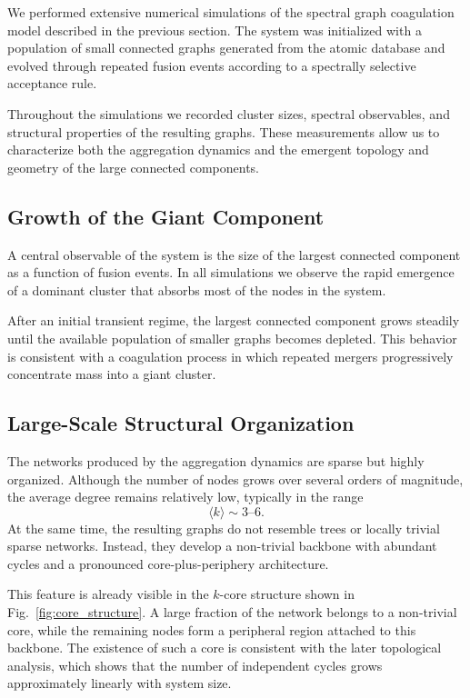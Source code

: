 \documentclass[11pt]{article}
\begin{document}
We performed extensive numerical simulations of the spectral graph coagulation model described in the previous section.
The system was initialized with a population of small connected graphs generated from the atomic database \cite{gonzalez2025algebraic} and evolved through repeated fusion events according to a spectrally selective acceptance rule.

Throughout the simulations we recorded cluster sizes, spectral observables, and structural properties of the resulting graphs.
These measurements allow us to characterize both the aggregation dynamics and the emergent topology and geometry of the large connected components.

\subsection{Growth of the Giant Component}

A central observable of the system is the size of the largest connected component as a function of fusion events.
In all simulations we observe the rapid emergence of a dominant cluster that absorbs most of the nodes in the system.

After an initial transient regime, the largest connected component grows steadily until the available population of smaller graphs becomes depleted.
This behavior is consistent with a coagulation process in which repeated mergers progressively concentrate mass into a giant cluster.

\subsection{Large-Scale Structural Organization}

The networks produced by the aggregation dynamics are sparse but highly organized.
Although the number of nodes grows over several orders of magnitude, the average degree remains relatively low, typically in the range
\[
\langle k\rangle \sim 3\text{--}6.
\]
At the same time, the resulting graphs do not resemble trees or locally trivial sparse networks.
Instead, they develop a non-trivial backbone with abundant cycles and a pronounced core-plus-periphery architecture.

This feature is already visible in the $k$-core structure shown in Fig.~\ref{fig:core_structure}.
A large fraction of the network belongs to a non-trivial core, while the remaining nodes form a peripheral region attached to this backbone.
The existence of such a core is consistent with the later topological analysis, which shows that the number of independent cycles grows approximately linearly with system size.
\end{document}
